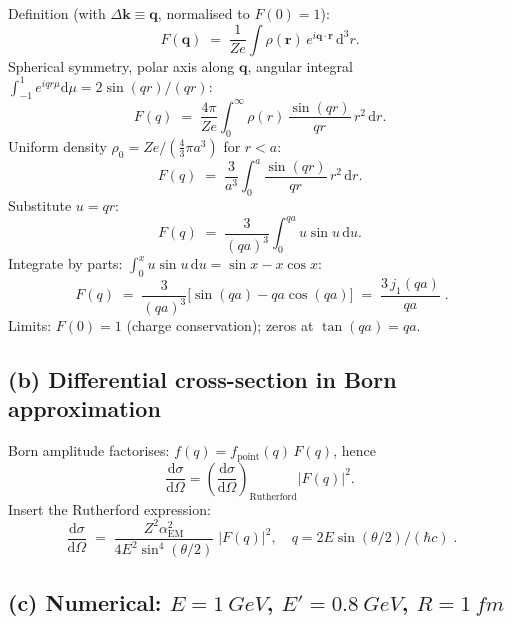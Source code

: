 \documentclass[11pt]{article}
\newcommand{\de}{\mathrm{d}}
\begin{document}
Definition (with $\Delta\bm k\equiv\bm q$, normalised to $F(0)=1$):
\begin{equation}
F(\bm q) \;=\; \frac{1}{Ze}\!\int\rho(\bm r)\,e^{i\bm q\cdot\bm r}\,\de^3 r.
\label{eq:Fdef}
\end{equation}
Spherical symmetry, polar axis along $\bm q$, angular integral $\int_{-1}^{1}e^{iqr\mu}\de\mu = 2\sin(qr)/(qr)$:
\[
F(q) \;=\; \frac{4\pi}{Ze}\!\int_0^\infty\!\rho(r)\,\frac{\sin(qr)}{qr}\,r^2\,\de r.
\]
Uniform density $\rho_0 = Ze/(\tfrac{4}{3}\pi a^3)$ for $r<a$:
\[
F(q) \;=\; \frac{3}{a^3}\!\int_0^a\!\frac{\sin(qr)}{qr}\,r^2\,\de r.
\]
Substitute $u=qr$:
\[
F(q) \;=\; \frac{3}{(qa)^3}\!\int_0^{qa}\!u\sin u\,\de u.
\]
Integrate by parts: $\int_0^x u\sin u\,\de u = \sin x - x\cos x$:
\begin{equation}
\boxed{\;F(q) \;=\; \frac{3}{(qa)^3}\bigl[\sin(qa)-qa\cos(qa)\bigr] \;=\; \frac{3\,j_1(qa)}{qa}\;.}
\label{eq:Fsphere}
\end{equation}
Limits: $F(0)=1$ (charge conservation); zeros at $\tan(qa)=qa$.

\subsection*{(b) Differential cross-section in Born approximation}

Born amplitude factorises: $f(q) = f_\text{point}(q)\,F(q)$, hence
\[
\frac{\de\sigma}{\de\Omega} = \left(\frac{\de\sigma}{\de\Omega}\right)_\text{Rutherford}\!\!|F(q)|^2.
\]
Insert the Rutherford expression:
\begin{equation}
\boxed{\;\frac{\de\sigma}{\de\Omega} \;=\; \frac{Z^2\alpha_\text{EM}^2}{4E^2\sin^4(\theta/2)}\;|F(q)|^2,\quad q=2E\sin(\theta/2)/(\hbar c)\;.}
\label{eq:dsig}
\end{equation}

\subsection*{(c) Numerical: $E=\SI{1}{GeV}$, $E'=\SI{0.8}{GeV}$, $R=\SI{1}{fm}$}
\end{document}
